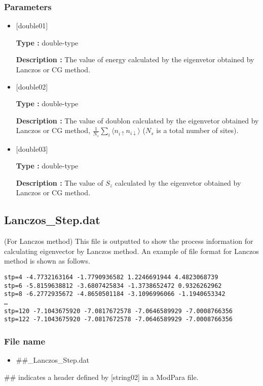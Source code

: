 \subsubsection{Parameters}
 \begin{itemize}

  \item  $[$double01$]$
  
 {\bf Type :} double-type

{\bf Description :} The value of energy calculated by the eigenvetor obtained by Lanczos or CG method.
 
  \item  $[$double02$]$

 {\bf Type :} double-type 

{\bf Description :}  The value of doublon calculated by the eigenvetor obtained by Lanczos or CG method,
$\frac{1}{N_s} \sum_{i}\langle n_{i\uparrow}n_{i\downarrow}\rangle$ ($N_s$ is a total number of sites).

  \item  $[$double03$]$

 {\bf Type :} double-type 

{\bf Description :}  The value of $S_z$ calculated by the eigenvetor obtained by Lanczos or CG method.

 \end{itemize}


\newpage
\subsection{Lanczos\_Step.dat}
(For Lanczos method) 
This file is outputted to show the process information for calculating eigenvector by Lanczos method.
An example of file format for Lanczos method is shown as follows.\\
\begin{minipage}{15cm}
\begin{screen}
\begin{verbatim}
stp=4 -4.7732163164 -1.7790936582 1.2246691944 4.4823068739
stp=6 -5.8159638812 -3.6807425834 -1.3738652472 0.9326262962
stp=8 -6.2772935672 -4.8650501184 -3.1096996066 -1.1940653342
…
stp=120 -7.1043675920 -7.0817672578 -7.0646589929 -7.0008766356
stp=122 -7.1043675920 -7.0817672578 -7.0646589929 -7.0008766356
\end{verbatim}
\end{screen}
\end{minipage}

\subsubsection{File name}
 \begin{itemize}
   \item  \#\#\_Lanczos\_Step.dat
  \end{itemize}
 \#\# indicates a header defined by [string02] in a ModPara file.

